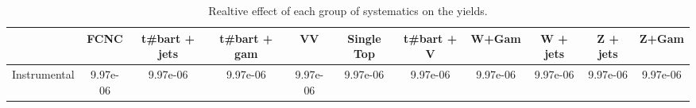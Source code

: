 \begin{table}[htbp]
\begin{center}
\begin{tabular}{|c|c|c|c|c|c|c|c|c|c|c|}
\hline 
      & FCNC      & t#bar{t} + jets      & t#bar{t} +  gam      & VV      & Single Top      & t#bar{t} + V      & W+Gam      & W + jets      & Z + jets      & Z+Gam \\ 
\hline 
 Instrumental & 9.97e-06 & 9.97e-06 & 9.97e-06 & 9.97e-06 & 9.97e-06 & 9.97e-06 & 9.97e-06 & 9.97e-06 & 9.97e-06 & 9.97e-06 \\ 
\hline 
\end{tabular} 
\caption{Realtive effect of each group of systematics on the yields.} 
\end{center} 
\end{table} 
